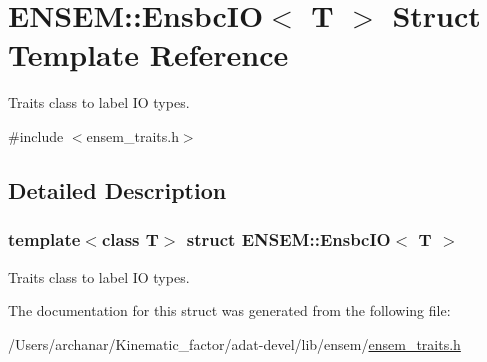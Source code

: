 \hypertarget{structENSEM_1_1EnsbcIO}{}\section{E\+N\+S\+EM\+:\+:Ensbc\+IO$<$ T $>$ Struct Template Reference}
\label{structENSEM_1_1EnsbcIO}


Traits class to label IO types.  




{\ttfamily \#include $<$ensem\+\_\+traits.\+h$>$}



\subsection{Detailed Description}
\subsubsection*{template$<$class T$>$\newline
struct E\+N\+S\+E\+M\+::\+Ensbc\+I\+O$<$ T $>$}

Traits class to label IO types. 

The documentation for this struct was generated from the following file\+:\begin{DoxyCompactItemize}
\item 
/\+Users/archanar/\+Kinematic\+\_\+factor/adat-\/devel/lib/ensem/\mbox{\hyperlink{adat-devel_2lib_2ensem_2ensem__traits_8h}{ensem\+\_\+traits.\+h}}\end{DoxyCompactItemize}
